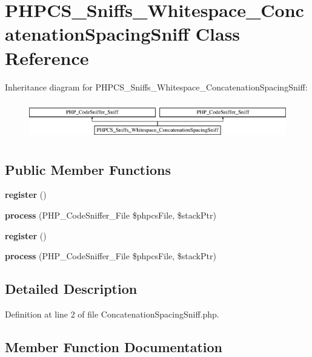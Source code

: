 \section{P\+H\+P\+C\+S\+\_\+\+Sniffs\+\_\+\+Whitespace\+\_\+\+Concatenation\+Spacing\+Sniff Class Reference}
\label{class_p_h_p_c_s___sniffs___whitespace___concatenation_spacing_sniff}
Inheritance diagram for P\+H\+P\+C\+S\+\_\+\+Sniffs\+\_\+\+Whitespace\+\_\+\+Concatenation\+Spacing\+Sniff\+:\begin{figure}[H]
\begin{center}
\leavevmode
\includegraphics[height=1.681682cm]{class_p_h_p_c_s___sniffs___whitespace___concatenation_spacing_sniff}
\end{center}
\end{figure}
\subsection*{Public Member Functions}
\begin{DoxyCompactItemize}
\item 
{\bf register} ()
\item 
{\bf process} (P\+H\+P\+\_\+\+Code\+Sniffer\+\_\+\+File \$phpcs\+File, \$stack\+Ptr)
\item 
{\bf register} ()
\item 
{\bf process} (P\+H\+P\+\_\+\+Code\+Sniffer\+\_\+\+File \$phpcs\+File, \$stack\+Ptr)
\end{DoxyCompactItemize}


\subsection{Detailed Description}


Definition at line 2 of file Concatenation\+Spacing\+Sniff.\+php.



\subsection{Member Function Documentation}
